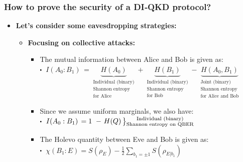 \documentclass{beamer}
\newcommand\sbullet[1][.5]{\mathbin{\vcenter{\hbox{\scalebox{#1}{$\bullet$}}}}}
\newenvironment{rcases}
  {\left.\begin{aligned}}
  {\end{aligned}\right\rbrace}
\begin{document}
		\begin{frame}
			\frametitle{\large How to prove the security of a DI‑QKD protocol?}

            \vspace{3ex}
            \begin{itemize}
                \item \textbf{Let's consider some eavesdropping strategies:}
                \begin{itemize}
                    \item \textbf{Focusing on collective attacks:}
                    \begin{itemize}
                        \item The mutual information between Alice and Bob is given as:\\
                        \vspace{0.5ex}
                        $\sbullet$\, $I({A}_{0}:{B}_{1})\, = \underbrace{H({A}_{0})}_{\substack{\text{Individual (binary)}\\ \text{Shannon entropy}\\ \text{for Alice}}} + \underbrace{H({B}_{1})}_{\substack{\text{Individual (binary)}\\ \text{Shannon entropy}\\ \text{for Bob}}} - \underbrace{H({A}_{0},{B}_{1})}_{\substack{\text{Joint (binary)}\\ \text{Shannon entropy}\\ \text{for Alice and Bob}}}$
                        \vspace{0.75ex}
                        \item Since we assume uniform marginals, we also have:\\
                        \vspace{0.5ex}
                        $\sbullet$\, $I({A}_{0}:{B}_{1})\, = 1\ - \begin{rcases}H(Q)\,\end{rcases}\substack{\text{Individual (binary)}\\ \text{Shannon entropy on QBER}}$
                        \vspace{1.5ex}
                        \item The Holevo quantity between Eve and Bob is given as:\\
                        \vspace{0.5ex}
                        $\sbullet$\, $\chi({B}_{1}:E) = S({\rho}_{E}) - \frac{1}{2} \sum_{{b}_{1} = \pm 1} S({\rho}_{E|{b}_{1}})$\\

\end{itemize}
\end{itemize}
\end{itemize}
\end{frame}
\end{document}
